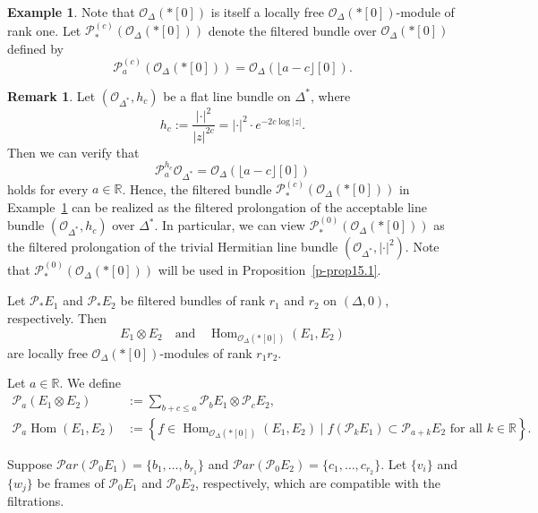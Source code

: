 \documentclass[12pt,twoside]{amsart}
\DeclareMathOperator{\Hom}{Hom}
\theoremstyle{definition}
\newtheorem{rem}[thm]{Remark}
\newtheorem{ex}[thm]{Example}
\begin{document}
\begin{ex}\label{p-ex14.1}
Note that $\mathcal{O}_\Delta(*[0])$ is itself 
a locally free $\mathcal{O}_\Delta(*[0])$-module of rank one. 
Let $\mathcal{P}^{(c)}_\ast\left(\mathcal{O}_\Delta(*[0])\right)$ 
denote the filtered bundle over $\mathcal{O}_\Delta(*[0])$ defined by
\[
\mathcal{P}^{(c)}_a \left(\mathcal{O}_\Delta(*[0])\right) 
= \mathcal{O}_\Delta(\lfloor a - c \rfloor [0]).
\] 
\end{ex}

\begin{rem}\label{p-rem14.2}
Let $(\mathcal{O}_{\Delta^*}, h_c)$ be a flat line bundle on $\Delta^*$, where
\[
h_c := \frac{|\cdot|^2}{|z|^{2c}} = |\cdot|^2 \cdot e^{-2c \log |z|}.
\]
Then we can verify that
\[
\mathcal{P}^{h_c}_a \mathcal{O}_{\Delta^*} 
= \mathcal{O}_\Delta\left(\lfloor a - c \rfloor [0]\right)
\]
holds for every $a \in \mathbb{R}$. 
Hence, the filtered 
bundle $\mathcal{P}^{(c)}_\ast\left(\mathcal{O}_\Delta(\ast[0])\right)$ 
in Example~\ref{p-ex14.1} can be realized as 
the filtered prolongation of the acceptable line bundle 
$(\mathcal{O}_{\Delta^*}, h_c)$ over $\Delta^*$. 
In particular, we can view 
$\mathcal{P}^{(0)}_\ast\left(\mathcal{O}_{\Delta}(\ast [0])\right)$ 
as the filtered prolongation of the trivial Hermitian line bundle 
$(\mathcal{O}_{\Delta^*}, |\cdot|^2)$. 
Note that 
$\mathcal{P}^{(0)}_\ast\left(\mathcal{O}_{\Delta}(\ast [0])\right)$ 
will be used in Proposition~\ref{p-prop15.1}.
\end{rem}

Let $\mathcal{P}_\ast E_1$ and $\mathcal{P}_\ast E_2$ be 
filtered bundles of rank $r_1$ and $r_2$ on $(\Delta, 0)$, respectively. Then 
\[
E_1 \otimes E_2 \quad \text{and} \quad 
\Hom_{\mathcal{O}_\Delta(*[0])}(E_1, E_2)
\]
are locally free $\mathcal{O}_\Delta(*[0])$-modules of rank $r_1 r_2$.

Let $a \in \mathbb{R}$. We define
\begin{align*}
\mathcal{P}_a(E_1 \otimes E_2) & 
:= \sum_{b + c \leq a} \mathcal{P}_b E_1 \otimes \mathcal{P}_c E_2, \\
\mathcal{P}_a \Hom(E_1, E_2) & 
:= \left\{ f \in \Hom_{\mathcal{O}_\Delta(*[0])}(E_1, E_2) \mid 
f(\mathcal{P}_k E_1) \subset \mathcal{P}_{a+k} E_2 \text{ for all } k 
\in \mathbb{R} \right\}.
\end{align*}

Suppose $\mathcal{P}ar(\mathcal{P}_0 E_1) 
= \{b_1, \dots, b_{r_1}\}$ and $\mathcal{P}ar(\mathcal{P}_0 E_2) 
= \{c_1, \dots, c_{r_2}\}$. Let $\{v_i\}$ and $\{w_j\}$ be frames 
of $\mathcal{P}_0 E_1$ and $\mathcal{P}_0 E_2$, 
respectively, which are compatible with the filtrations.
\end{document}
